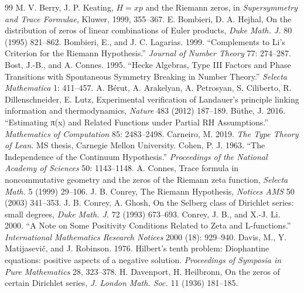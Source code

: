 \documentclass[10pt]{article}
\begin{document}
\begin{thebibliography}{99}
\footnotesize
{} M. V. Berry, J. P. Keating, $H = xp$ and the Riemann zeros, in \emph{Supersymmetry and Trace Formulae}, Kluwer, 1999, 355--367.
 E. Bombieri, D. A. Hejhal, On the distribution of zeros of linear combinations of Euler products, \emph{Duke Math. J.} 80 (1995) 821--862.
 Bombieri, E., and J. C. Lagarias. 1999. ``Complements to Li's Criterion for the Riemann Hypothesis.'' \emph{Journal of Number Theory} 77: 274--287.
 Bost, J.-B., and A. Connes. 1995. ``Hecke Algebras, Type III Factors and Phase Transitions with Spontaneous Symmetry Breaking in Number Theory.'' \emph{Selecta Mathematica} 1: 411--457.
 A. B\'erut, A. Arakelyan, A. Petrosyan, S. Ciliberto, R. Dillenschneider, E. Lutz, Experimental verification of Landauer's principle linking information and thermodynamics, \emph{Nature} 483 (2012) 187--189.
 Büthe, J. 2016. ``Estimating π(x) and Related Functions under Partial RH Assumptions.'' \emph{Mathematics of Computation} 85: 2483--2498.
 Carneiro, M. 2019. \emph{The Type Theory of Lean}. MS thesis, Carnegie Mellon University.
 Cohen, P. J. 1963. ``The Independence of the Continuum Hypothesis.'' \emph{Proceedings of the National Academy of Sciences} 50: 1143--1148.
 A. Connes, Trace formula in noncommutative geometry and the zeros of the Riemann zeta function, \emph{Selecta Math.} 5 (1999) 29--106.
 J. B. Conrey, The Riemann Hypothesis, \emph{Notices AMS} 50 (2003) 341--353.
 J. B. Conrey, A. Ghosh, On the Selberg class of Dirichlet series: small degrees, \emph{Duke Math. J.} 72 (1993) 673--693.
 Conrey, J. B., and X.-J. Li. 2000. ``A Note on Some Positivity Conditions Related to Zeta and L-functions.'' \emph{International Mathematics Research Notices} 2000 (18): 929--940.
 Davis, M., Y. Matijasevič, and J. Robinson. 1976. Hilbert's tenth problem: Diophantine equations: positive aspects of a negative solution. \emph{Proceedings of Symposia in Pure Mathematics} 28, 323--378.
 H. Davenport, H. Heilbronn, On the zeros of certain Dirichlet series, \emph{J. London Math. Soc.} 11 (1936) 181--185.

\end{thebibliography}
\end{document}
